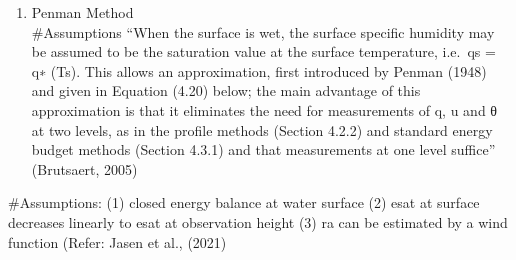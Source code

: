 \documentclass[
]{article}
\newenvironment{Shaded}{\begin{snugshade}}{\end{snugshade}}
\newcommand{\CommentTok}[1]{\textcolor[rgb]{0.56,0.35,0.01}{\textit{#1}}}
\newcommand{\DecValTok}[1]{\textcolor[rgb]{0.00,0.00,0.81}{#1}}
\newcommand{\NormalTok}[1]{#1}
\newcommand{\OtherTok}[1]{\textcolor[rgb]{0.56,0.35,0.01}{#1}}
\newcommand{\SpecialCharTok}[1]{\textcolor[rgb]{0.00,0.00,0.00}{#1}}
\providecommand{\tightlist}{%
  \setlength{\itemsep}{0pt}\setlength{\parskip}{0pt}}
\begin{document}
\begin{Shaded}
\end{Shaded}

\begin{enumerate}
\def\labelenumi{\arabic{enumi}.}
\setcounter{enumi}{1}
\tightlist
\item
  Penman Method\\
  \#Assumptions ``When the surface is wet, the surface specific humidity
  may be assumed to be the saturation value at the surface temperature,
  i.e.~qs = q∗ (Ts). This allows an approximation, first introduced by
  Penman (1948) and given in Equation (4.20) below; the main advantage
  of this approximation is that it eliminates the need for measurements
  of q, u and θ at two levels, as in the profile methods (Section 4.2.2)
  and standard energy budget methods (Section 4.3.1) and that
  measurements at one level suffice'' (Brutsaert, 2005)
\end{enumerate}

\#Assumptions: (1) closed energy balance at water surface (2) esat at
surface decreases linearly to esat at observation height (3) ra can be
estimated by a wind function (Refer: Jasen et al., (2021)
\end{document}
